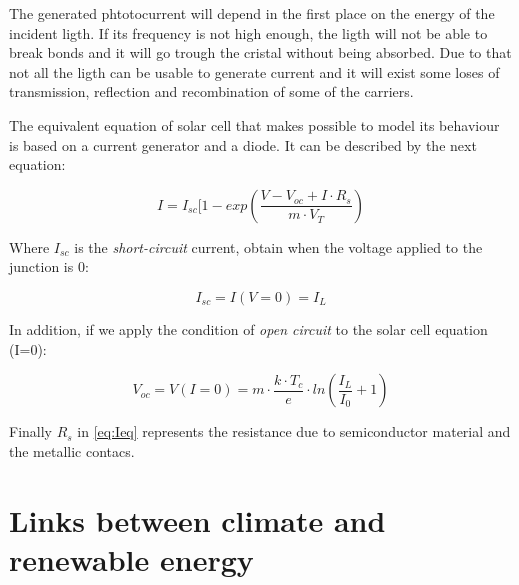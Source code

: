
The generated phtotocurrent will depend in the first place on the energy of the incident ligth. If its frequency is not high enough, the ligth will not be able to break bonds and it will go trough the cristal without being absorbed. Due to that not all the ligth can be usable to generate current and it will exist some loses of transmission, reflection and recombination of some of the carriers.

The equivalent equation of solar cell that makes possible to model its behaviour is based on a current generator and a diode. It can be described by the next equation:

\begin{equation}
  I=I_{sc}[1-exp({\frac{V-V_{oc}+I\cdot R_s}{m\cdot V_T}})
\label{eq:Ieq}
\end{equation}

Where $I_{sc}$ is the \textit{short-circuit} current, obtain when the voltage applied to the junction is 0:

\begin{equation}
  I_{sc}=I(V=0)=I_L
\label{eq:Isc}
\end{equation}

In addition, if we apply the condition of \textit{open circuit} to the solar cell equation (I=0):

\begin{equation}
  V_{oc}=V(I=0)=m\cdot {\frac{k\cdot T_c}{e}}\cdot ln({\frac{I_L}{I_0}}+1)
\label{eq:Voc}
\end{equation}

Finally $R_s$ in \ref{eq:Ieq} represents the resistance due to semiconductor material and the metallic contacs.


\section{Links between climate and renewable energy}

